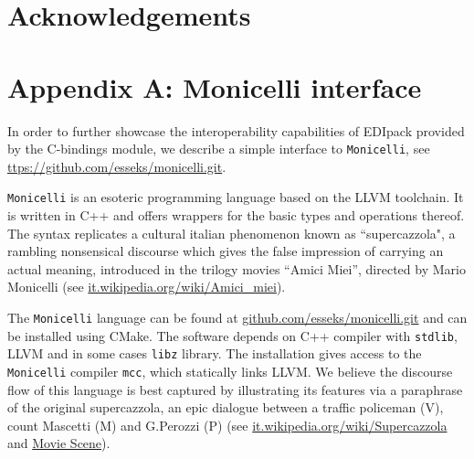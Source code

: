 \documentclass[preprint,3p,10pt]{elsarticle}
\def\NAME{{\rm EDIpack}\xspace}
\begin{document}

\section*{Acknowledgements}

\section{Appendix A: Monicelli interface}\label{appendixA}
In order to further showcase the interoperability capabilities of
\NAME provided by the C-bindings module, we describe a simple interface to {\tt Monicelli}, see
\href{github.com/esseks/monicelli.git}{ttps://github.com/esseks/monicelli.git}. 

  
{\tt Monicelli} is an esoteric programming language based on the LLVM
toolchain.
It is written in C++ and offers wrappers for the basic
types and operations thereof. The syntax replicates a cultural italian
phenomenon known as ``supercazzola", a rambling nonsensical discourse
which gives the false impression of carrying an actual meaning,
introduced in the trilogy movies ``Amici Miei'', directed by Mario
Monicelli (see
\href{https://it.wikipedia.org/wiki/Amici_miei}{it.wikipedia.org/wiki/Amici\_miei}). 

The {\tt Monicelli} language can be found at
\href{https://github.com/esseks/monicelli.git}{github.com/esseks/monicelli.git}
and can be installed using CMake. The software depends on C++
compiler with {\tt stdlib}, LLVM and in some cases {\tt libz} library. The installation gives access to the {\tt
  Monicelli} compiler {\tt mcc}, which statically links LLVM. 
We believe the discourse flow of this language is best captured by 
illustrating its features via a paraphrase of the original supercazzola, an epic dialogue between a traffic policeman (V), count Mascetti (M) and G.Perozzi (P) (see
\href{https://it.wikipedia.org/wiki/Supercazzola#Origine}{it.wikipedia.org/wiki/Supercazzola}
and \href{https://www.youtube.com/watch?v=SF8YUFdP6eU}{Movie Scene}). 
\end{document}
